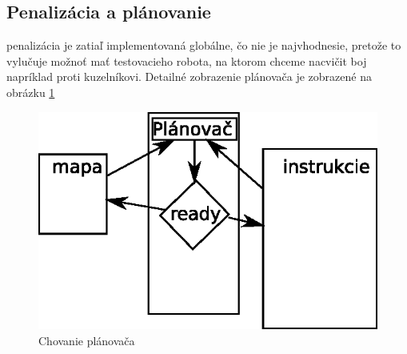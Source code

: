 \subsection{Penalizácia a plánovanie}
penalizácia je zatiaľ implementovaná globálne, čo nie je najvhodnesie, pretože to vylučuje možnoť mať testovacieho robota, na ktorom chceme nacvičit boj napríklad proti kuzelníkovi. Detailné zobrazenie plánovača je zobrazené na obrázku \ref{fig:sch}
\begin{figure}
\centering
\includegraphics{planovac}
\caption{Chovanie plánovača}
\label{fig:sch}
\end{figure}
